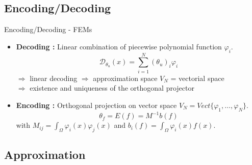 \subsection{Encoding/Decoding}

\begin{frame}{Encoding/Decoding - FEMs}
	\begin{itemize}[\textbullet]
		\item \textbf{Decoding :} Linear combination of piecewise polynomial function $\varphi_i$.
		\begin{equation*}
			\mathcal{D}_{\theta_u}(x) = \sum_{i=1}^{N}(\theta_u)_i\varphi_i
		\end{equation*}
		$\Rightarrow$ linear decoding $\Rightarrow$ approximation space $V_N$ = vectorial space \\
		$\Rightarrow$ existence and uniqueness of the orthogonal projector
		\item \textbf{Encoding :} Orthogonal projection on vector space $V_N=Vect\{\varphi_1,\dots,\varphi_N\}$.
		\begin{equation*}
			\theta_f=E(f)=M^{-1}b(f)
		\end{equation*}
		with $M_{ij}=\int_\Omega \varphi_i(x)\varphi_j(x)$ and $b_i(f)=\int_\Omega \varphi_i(x)f(x)$.  
	\end{itemize}
\end{frame}

\subsection{Approximation}

